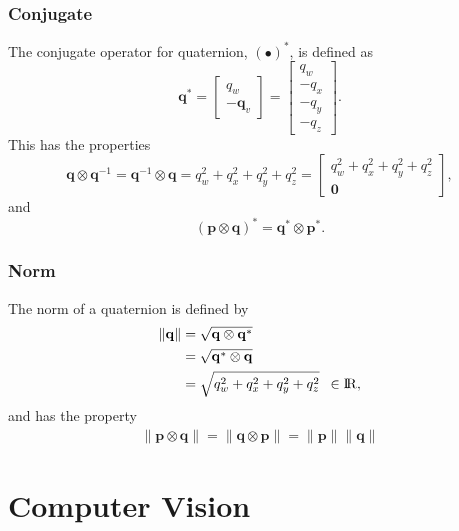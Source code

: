 \documentclass{article}
\renewcommand{\Vec}[1]{{\mathbf{#1}}}
\newcommand{\real}{{\rm I\!R}}
\newcommand{\Norm}[1]{{\|#1\|}}
\newcommand{\quat}{{\Vec{q}}}
\begin{document}
\subsubsection{Conjugate}

The conjugate operator for quaternion, ${(\bullet)}^{\ast}$, is
defined as
%
\begin{equation}
  \quat^{\ast}
  =
  \begin{bmatrix}
    q_w \\
    - \Vec{q}_v
  \end{bmatrix}
  =
  \begin{bmatrix}
    q_w \\
    - q_x \\
    - q_y \\
    - q_z
  \end{bmatrix}.
\end{equation}
%
This has the properties
%
\begin{equation}
  \quat \otimes \quat^{-1}
  = \quat^{-1} \otimes \quat
  = q_{w}^{2} + q_{x}^{2} + q_{y}^{2} + q_{z}^{2}
  =
  \begin{bmatrix}
    q_{w}^{2} + q_{x}^{2} + q_{y}^{2} + q_{z}^{2} \\
    \Vec{0}
  \end{bmatrix},
\end{equation}
%
and
%
\begin{equation}
  (\Vec{p} \otimes \Vec{q})^{\ast}
  = \Vec{q}^{\ast} \otimes \Vec{p}^{\ast}.
\end{equation}


\subsubsection{Norm}

The norm of a quaternion is defined by
%
\begin{align}
  \Norm{\quat} &= \sqrt{\quat \otimes \quat^{\ast}} \\
    &= \sqrt{\quat^{\ast} \otimes \quat} \\
    &= \sqrt{q_{w}^{2} + q_{x}^{2} + q_{y}^{2} + q_{z}^{2}}
    \enspace \in \real,
\end{align}
%
and has the property
%
\begin{align}
  \Norm{\Vec{p} \otimes \Vec{q}} =
  \Norm{\Vec{q} \otimes \Vec{p}} =
  \Norm{\Vec{p}} \Norm{\Vec{q}}
\end{align}



\newpage
\section{Computer Vision}
\end{document}

